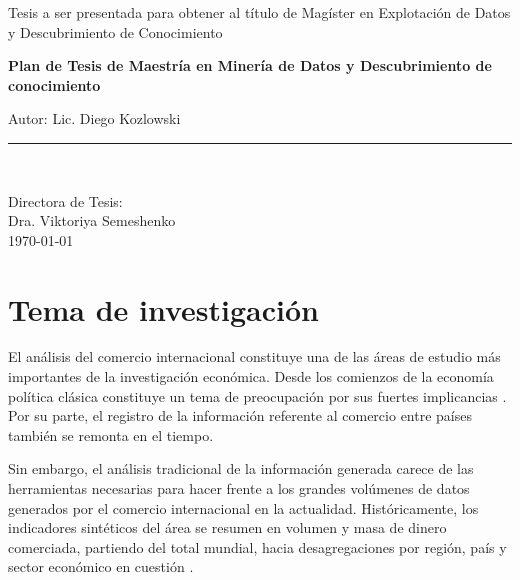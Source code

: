 \documentclass[runningheads,a4paper]{llncs}
\begin{document}
\begin{titlepage}
\begin{center}
\begin{large}
Tesis a ser presentada para obtener al título de Magíster en Explotación de Datos y Descubrimiento de Conocimiento\\	
\end{large}
\vspace*{0.2in}
\begin{Large}
\textbf{Plan de Tesis de Maestría en Minería de Datos y Descubrimiento de conocimiento} \\
\end{Large}
\vspace*{0.25in}
\begin{large}
Autor: Lic. Diego Kozlowski\\
\end{large}
\vspace*{0.3in}
\rule{80mm}{0.1mm}\\
\vspace*{0.1in}
\begin{large}
Directora de Tesis: \\
Dra. Viktoriya Semeshenko \\
\today
\end{large}
\end{center}

\end{titlepage}

\tableofcontents



\section[Tema]{Tema de investigación}

El análisis del comercio internacional constituye una de las áreas de estudio más importantes de la investigación económica. Desde los comienzos de la economía política clásica constituye un tema de preocupación por sus fuertes implicancias \cite{ricardo1987principios}. Por su parte, el registro de la información referente al comercio entre países también se remonta en el tiempo.          

Sin embargo, el análisis tradicional de la información generada carece de las herramientas necesarias para hacer frente a los grandes volúmenes de datos generados por el comercio internacional en la actualidad. Históricamente, los indicadores sintéticos del área se resumen en volumen y masa de dinero comerciada, partiendo del total mundial, hacia desagregaciones por región, país y sector económico en cuestión \cite{WTO2017}.                
\end{document}
